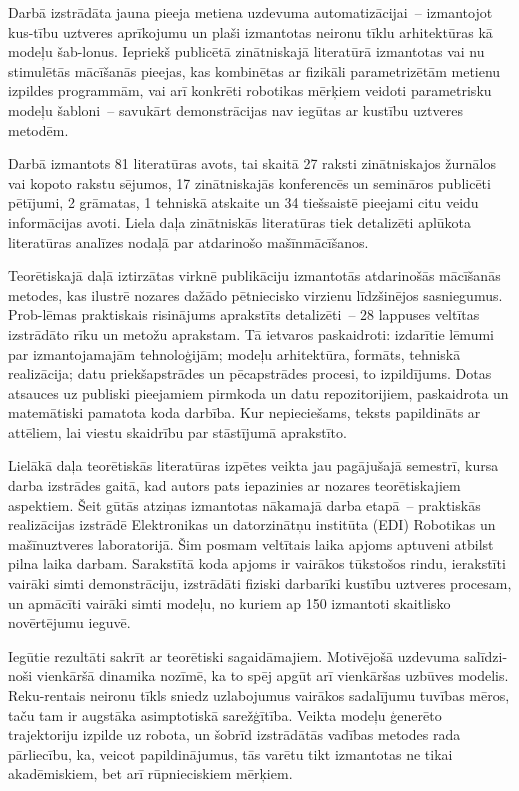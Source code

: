 \documentclass[12pt, a4paper]{article}
\numberwithin{equation}{section} %
\begin{document}
Darbā izstrādāta jauna pieeja metiena uzdevuma automatizācijai~-- izmantojot kus-tību uztveres aprīkojumu un plaši izmantotas neironu tīklu arhitektūras kā modeļu šab-lonus. Iepriekš publicētā zinātniskajā literatūrā izmantotas vai nu stimulētās mācīšanās pieejas, kas kombinētas ar fizikāli parametrizētām metienu izpildes programmām, vai arī konkrēti robotikas mērķiem veidoti parametrisku modeļu šabloni~-- savukārt demonstrācijas nav iegūtas ar kustību uztveres metodēm.

Darbā izmantots 81 literatūras avots, tai skaitā 27 raksti zinātniskajos žurnālos vai kopoto rakstu sējumos, 17 zinātniskajās konferencēs un semināros publicēti pētījumi, 2 grāmatas, 1 tehniskā atskaite un 34 tiešsaistē pieejami citu veidu informācijas avoti. Liela daļa zinātniskās literatūras tiek detalizēti aplūkota literatūras analīzes nodaļā par atdarinošo mašīnmācīšanos.

Teorētiskajā daļā iztirzātas virknē publikāciju izmantotās atdarinošās mācīšanās metodes, kas ilustrē nozares dažādo pētniecisko virzienu līdzšinējos sasniegumus. Prob-lēmas praktiskais risinājums aprakstīts detalizēti~-- 28 lappuses veltītas izstrādāto rīku un metožu aprakstam. Tā ietvaros paskaidroti: izdarītie lēmumi par izmantojamajām tehnoloģijām; modeļu arhitektūra, formāts, tehniskā realizācija; datu priekšapstrādes un pēcapstrādes procesi, to izpildījums. Dotas atsauces uz publiski pieejamiem pirmkoda un datu repozitorijiem, paskaidrota un matemātiski pamatota koda darbība. Kur nepieciešams, teksts papildināts ar attēliem, lai viestu skaidrību par stāstījumā aprakstīto.

Lielākā daļa teorētiskās literatūras izpētes veikta jau pagājušajā semestrī, kursa darba izstrādes gaitā, kad autors pats iepazinies ar nozares teorētiskajiem aspektiem. Šeit gūtās atziņas izmantotas nākamajā darba etapā~-- praktiskās realizācijas izstrādē Elektronikas un datorzinātņu institūta (EDI) Robotikas un mašīnuztveres laboratorijā. Šim posmam veltītais laika apjoms aptuveni atbilst pilna laika darbam. Sarakstītā koda apjoms ir vairākos tūkstošos rindu, ierakstīti vairāki simti demonstrāciju, izstrādāti fiziski darbarīki kustību uztveres procesam, un apmācīti vairāki simti modeļu, no kuriem ap 150 izmantoti skaitlisko novērtējumu ieguvē.

Iegūtie rezultāti sakrīt ar teorētiski sagaidāmajiem. Motivējošā uzdevuma salīdzi-noši vienkāršā dinamika nozīmē, ka to spēj apgūt arī vienkāršas uzbūves modelis. Reku-rentais neironu tīkls sniedz uzlabojumus vairākos sadalījumu tuvības mēros, taču tam ir augstāka asimptotiskā sarežģītība. Veikta modeļu ģenerēto trajektoriju izpilde uz robota, un šobrīd izstrādātās vadības metodes rada pārliecību, ka, veicot papildinājumus, tās varētu tikt izmantotas ne tikai akadēmiskiem, bet arī rūpnieciskiem mērķiem.
\end{document}
